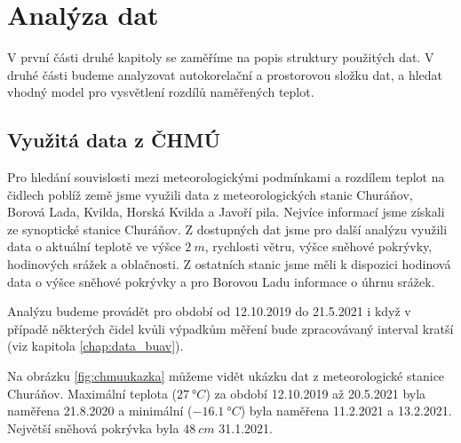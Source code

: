 \chapter{Analýza dat} \label{chap:analysis}
V první části druhé kapitoly se zaměříme na popis struktury použitých dat. V druhé části budeme analyzovat autokorelační a prostorovou složku dat, a hledat vhodný model pro vysvětlení rozdílů naměřených teplot.

\section{Využitá data z ČHMÚ}
Pro hledání souvislosti mezi meteorologickými podmínkami a rozdílem teplot na čidlech poblíž země jsme využili data z meteorologických stanic Churáňov, Borová Lada, Kvilda, Horská Kvilda a Javoří pila. Nejvíce informací jsme získali ze synoptické stanice Churáňov. Z dostupných dat jsme pro další analýzu využili data o aktuální teplotě ve výšce $\SI{2}{m}$, rychlosti větru, výšce sněhové pokrývky, hodinových srážek a oblačnosti. Z ostatních stanic jsme měli k dispozici hodinová data o výšce sněhové pokrývky a pro Borovou Ladu informace o úhrnu srážek.

Analýzu budeme provádět pro období od 12.10.2019 do 21.5.2021 i když v případě některých čidel kvůli výpadkům měření bude zpracovávaný interval kratší (viz kapitola \ref{chap:data_buav}).

Na obrázku \ref{fig:chmuukazka} můžeme vidět ukázku dat z meteorologické stanice Churáňov. Maximální teplota ($\SI{27}{\degree C}$) za období 12.10.2019 až 20.5.2021 byla naměřena 21.8.2020 a minimální ($\SI{-16.1}{\degree C}$) byla naměřena 11.2.2021 a 13.2.2021. Největší sněhová pokrývka byla $\SI{48}{cm}$ 31.1.2021.

